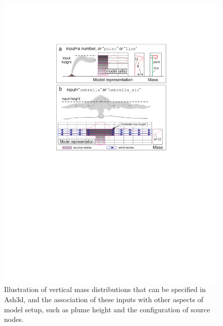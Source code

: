 \begin{figure}[htbp]\vspace*{-5cm}\hspace*{-2cm}
\includegraphics[angle=0,scale=0.8]{Figures/Scripts/VertMassDist.pdf}
\parbox{15cm}{\caption{\label{FigVertMassDistFormat}
Illustration of vertical mass distributions that can be specified in Ash3d, and
the association of these inputs with other aspects of model setup, such as plume
height and the configuration of source nodes.
}}
\end{figure}


